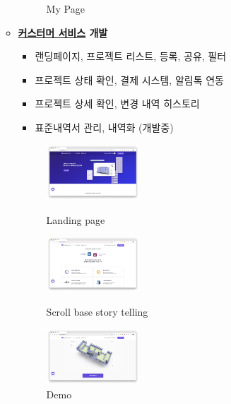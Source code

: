 \begin{itemize}[label=]
\begin{itemize}[label=]
\begin{figure}[!ht]
\begin{fullwidth}
{					            \caption*{My Page}
				            }
			            \end{fullwidth}
		            \end{figure}
		      \item \textbf{\href{https://app.builderhub.io}{커스터머 서비스} 개발}
		            \begin{itemize}
			            \item 랜딩페이지, 프로젝트 리스트, 등록, 공유, 필터
			            \item 프로젝트 상태 확인, 결제 시스템, 알림톡 연동
			            \item 프로젝트 상세 확인, 변경 내역 히스토리
			            \item 표준내역서 관리, 내역화 (개발중)
		            \end{itemize}
		            \begin{figure}[!ht]
			            \begin{fullwidth}
				            \parbox{0.35\textwidth}{
					            \centering
					            \includegraphics[width=0.35\textwidth]{images/builderhub-customer-1.png}
					            \caption*{Landing page}
				            }\qquad
				            \parbox{0.35\textwidth}{
					            \centering
					            \includegraphics[width=0.35\textwidth]{images/builderhub-customer-2.png}
					            \caption*{Scroll base story telling}
				            }\qquad
				            \parbox{0.35\textwidth}{
					            \centering
					            \includegraphics[width=0.35\textwidth]{images/builderhub-customer-3.png}
					            \caption*{Demo}
}
\end{fullwidth}
\end{figure}
\end{itemize}
\end{itemize}
